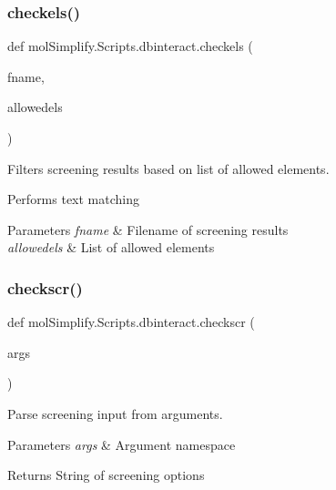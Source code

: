 \subsubsection{\texorpdfstring{checkels()}{checkels()}}
{\footnotesize\ttfamily def mol\+Simplify.\+Scripts.\+dbinteract.\+checkels (\begin{DoxyParamCaption}\item[{}]{fname,  }\item[{}]{allowedels }\end{DoxyParamCaption})}



Filters screening results based on list of allowed elements. 

Performs text matching 
\begin{DoxyParams}{Parameters}
{\em fname} & Filename of screening results \\
\hline
{\em allowedels} & List of allowed elements \\
\hline
\end{DoxyParams}
\mbox{\label{namespacemolSimplify_1_1Scripts_1_1dbinteract_a5000fc00f49c30c6e563846fe531a959}} 
\subsubsection{\texorpdfstring{checkscr()}{checkscr()}}
{\footnotesize\ttfamily def mol\+Simplify.\+Scripts.\+dbinteract.\+checkscr (\begin{DoxyParamCaption}\item[{}]{args }\end{DoxyParamCaption})}



Parse screening input from arguments. 


\begin{DoxyParams}{Parameters}
{\em args} & Argument namespace \\
\hline
\end{DoxyParams}
\begin{DoxyReturn}{Returns}
String of screening options 
\end{DoxyReturn}
\mbox{\label{namespacemolSimplify_1_1Scripts_1_1dbinteract_a4ff17f8e5ab72528618b47331a975143}} 
